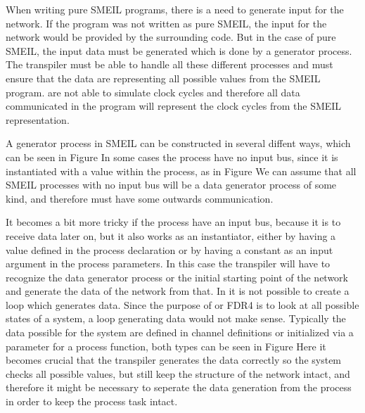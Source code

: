 When writing pure SMEIL programs, there is a need to generate input for the network. If the program was not written as pure SMEIL, the input for the network would be provided by the surrounding code. But in the case of pure SMEIL, the input data must be generated which is done by a generator process.
The transpiler must be able to handle all these different processes and must ensure that the data are representing all possible values from the SMEIL program. \cspm are not able to simulate clock cycles and therefore all data communicated in the \cspm program will represent the clock cycles from the SMEIL representation.

A generator process in SMEIL can be constructed in several diffent ways, which can be seen in Figure %
In some cases the process have no input bus, since it is instantiated with a value within the process, as in Figure %
We can assume that all SMEIL processes with no input bus will be a data generator process of some kind, and therefore must have some outwards communication. %

It becomes a bit more tricky if the process have an input bus, because it is to receive data later on, but it also works as an instantiator, either by having a value defined in the process declaration %
or by having a constant as an input argument in the process parameters. In this case the transpiler will have to recognize the data generator process or the initial starting point of the network and generate the data of the network from that. %
In \cspm it is not possible to create a loop which generates data. Since the purpose of \cspm or FDR4 is to look at all possible states of a system, a loop generating data would not make sense. Typically the data possible for the system are defined in channel definitions or initialized via a parameter for a process function, both types can be seen in Figure %
Here it becomes crucial that the transpiler generates the data correctly so the system checks all possible values, but still keep the structure of the network intact, and therefore it might be necessary to seperate the data generation from the process in order to keep the process task intact.

